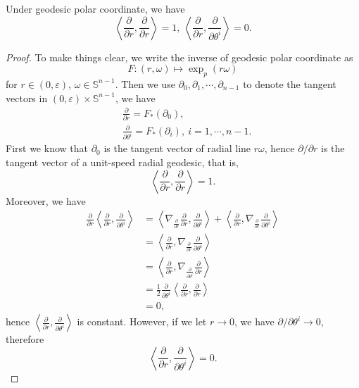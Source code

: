 \begin{prop}
    Under geodesic polar coordinate, we have
    \[\left\langle\frac{\partial}{\partial{r}},\frac{\partial}{\partial{r}}\right\rangle=1,\ \left\langle\frac{\partial}{\partial{r}},\frac{\partial}{\partial{\theta^i}}\right\rangle=0.\]
\end{prop}
\begin{proof}
    To make things clear, we write the inverse of geodesic polar coordinate as
    \[F:(r,\omega)\mapsto\exp_p(r\omega)\]
    for $r\in(0,\varepsilon)$, $\omega\in\mathbb{S}^{n-1}$.
    Then we use $\partial_0,\partial_1,\cdots,\partial_{n-1}$ to denote the tangent vectors in $(0,\varepsilon)\times\mathbb{S}^{n-1}$, we have
    \begin{align*}
        &\frac{\partial{}}{\partial{r}}=F_*(\partial_0),\\
        &\frac{\partial{}}{\partial{\theta^i}}=F_*(\partial_i),\ i=1,\cdots,n-1.
    \end{align*}
    First we know that $\partial_0$ is the tangent vector of radial line $r\omega$, hence $\partial/\partial{r}$ is the tangent vector of a unit-speed radial geodesic, that is,
    \[\left\langle\frac{\partial{}}{\partial{r}},\frac{\partial{}}{\partial{r}}\right\rangle=1.\]
    Moreover, we have
    \begin{align*}
        \frac{\partial}{\partial{r}}\left\langle\frac{\partial{}}{\partial{r}},\frac{\partial{}}{\partial{\theta^i}}\right\rangle&=\left\langle\nabla_{\frac{\partial{}}{\partial{r}}}\frac{\partial{}}{\partial{r}},\frac{\partial{}}{\partial{\theta^i}}\right\rangle+\left\langle\frac{\partial{}}{\partial{r}},\nabla_{\frac{\partial{}}{\partial{r}}}\frac{\partial{}}{\partial{\theta^i}}\right\rangle\\
        &=\left\langle\frac{\partial{}}{\partial{r}},\nabla_{\frac{\partial{}}{\partial{r}}}\frac{\partial{}}{\partial{\theta^i}}\right\rangle\\
        &=\left\langle\frac{\partial{}}{\partial{r}},\nabla_{\frac{\partial{}}{\partial{\theta^i}}}\frac{\partial{}}{\partial{r}}\right\rangle\\
        &=\frac{1}{2}\frac{\partial{}}{\partial{\theta^i}}\left\langle\frac{\partial{}}{\partial{r}},\frac{\partial{}}{\partial{r}}\right\rangle\\
        &=0,
    \end{align*}
    hence $\left\langle\frac{\partial{}}{\partial{r}},\frac{\partial{}}{\partial{\theta^i}}\right\rangle$ is constant.
    However, if we let $r\to 0$, we have $\partial/\partial{\theta^i}\to 0$, therefore
    \[\left\langle\frac{\partial{}}{\partial{r}},\frac{\partial{}}{\partial{\theta^i}}\right\rangle=0.\]
\end{proof}

